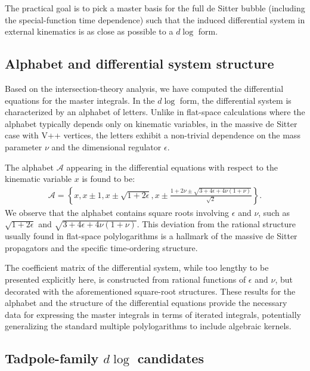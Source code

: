 \documentclass[a4paper,12pt]{article}
\begin{document}
The practical goal is to pick a master basis for the full de Sitter bubble (including the special-function time dependence) such that the induced differential system in external kinematics is as close as possible to a $d\log$ form.

\subsection{Alphabet and differential system structure}
Based on the intersection-theory analysis, we have computed the differential equations for the master integrals.
In the $d\log$ form, the differential system is characterized by an alphabet of letters.
Unlike in flat-space calculations where the alphabet typically depends only on kinematic variables, in the massive de Sitter case with V++ vertices, the letters exhibit a non-trivial dependence on the mass parameter $\nu$ and the dimensional regulator $\epsilon$.

The alphabet $\mathcal{A}$ appearing in the differential equations with respect to the kinematic variable $x$ is found to be:
\begin{align}
	\mathcal{A} = \left\{ x, x\pm 1, x\pm \sqrt{1+2\epsilon}, x \pm \frac{1+2\nu \pm \sqrt{3+4\epsilon+4\nu(1+\nu)}}{\sqrt{2}} \right\}.
\end{align}
We observe that the alphabet contains square roots involving $\epsilon$ and $\nu$, such as $\sqrt{1+2\epsilon}$ and $\sqrt{3+4\epsilon+4\nu(1+\nu)}$.
This deviation from the rational structure usually found in flat-space polylogarithms is a hallmark of the massive de Sitter propagators and the specific time-ordering structure.

The coefficient matrix of the differential system, while too lengthy to be presented explicitly here, is constructed from rational functions of $\epsilon$ and $\nu$, but decorated with the aforementioned square-root structures.
These results for the alphabet and the structure of the differential equations provide the necessary data for expressing the master integrals in terms of iterated integrals, potentially generalizing the standard multiple polylogarithms to include algebraic kernels.





\subsection{Tadpole-family \texorpdfstring{$d\log$}{dlog} candidates}
\label{sec:dlog_candidates}
\end{document}
